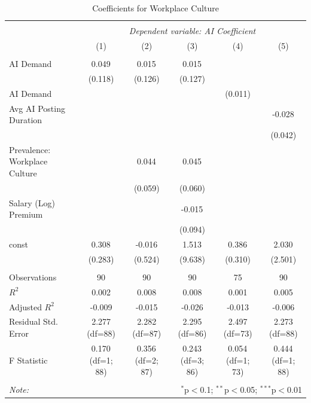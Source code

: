 \begin{table}[!htbp] \centering
  \caption{Coefficients for Workplace Culture}
\begin{tabular}{@{\extracolsep{5pt}}lccccc}
\\[-1.8ex]\hline
\hline \\[-1.8ex]
& \multicolumn{5}{c}{\textit{Dependent variable: AI Coefficient}} \
\cr \cline{2-6}
\\[-1.8ex] & (1) & (2) & (3) & (4) & (5) \\
\hline \\[-1.8ex]
 AI Demand & 0.049$^{}$ & 0.015$^{}$ & 0.015$^{}$ & & \\
& (0.118) & (0.126) & (0.127) & & \\
 AI Demand %
& & & & (0.011) & \\
 Avg AI Posting Duration & & & & & -0.028$^{}$ \\
& & & & & (0.042) \\
 Prevalence: Workplace Culture & & 0.044$^{}$ & 0.045$^{}$ & & \\
& & (0.059) & (0.060) & & \\
 Salary (Log) Premium & & & -0.015$^{}$ & & \\
& & & (0.094) & & \\
 const & 0.308$^{}$ & -0.016$^{}$ & 1.513$^{}$ & 0.386$^{}$ & 2.030$^{}$ \\
& (0.283) & (0.524) & (9.638) & (0.310) & (2.501) \\
\hline \\[-1.8ex]
 Observations & 90 & 90 & 90 & 75 & 90 \\
 $R^2$ & 0.002 & 0.008 & 0.008 & 0.001 & 0.005 \\
 Adjusted $R^2$ & -0.009 & -0.015 & -0.026 & -0.013 & -0.006 \\
 Residual Std. Error & 2.277 (df=88) & 2.282 (df=87) & 2.295 (df=86) & 2.497 (df=73) & 2.273 (df=88) \\
 F Statistic & 0.170$^{}$ (df=1; 88) & 0.356$^{}$ (df=2; 87) & 0.243$^{}$ (df=3; 86) & 0.054$^{}$ (df=1; 73) & 0.444$^{}$ (df=1; 88) \\
\hline
\hline \\[-1.8ex]
\textit{Note:} & \multicolumn{5}{r}{$^{*}$p$<$0.1; $^{**}$p$<$0.05; $^{***}$p$<$0.01} \\
\end{tabular}
\end{table}